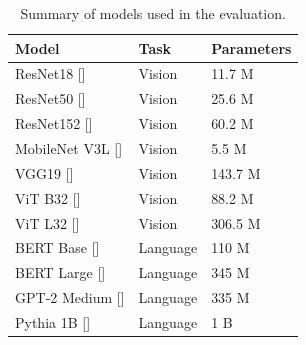 \begin{table}[t]
\centering

\begin{tabular}{l s s @{}}\\
\toprule
Model  & Task & Parameters \\
\midrule
ResNet18 [] & Vision & 11.7 M \\
ResNet50 [] & Vision & 25.6 M \\
ResNet152 [] & Vision & 60.2 M \\
MobileNet V3L []  & Vision & 5.5 M \\
VGG19 [] & Vision & 143.7 M \\
ViT B32 [] & Vision & 88.2 M \\
ViT L32 [] & Vision & 306.5 M \\
BERT Base [] & Language & 110 M \\
BERT Large []  & Language & 345 M \\
GPT-2 Medium [] & Language & 335 M \\
Pythia 1B [] & Language & 1 B \\
\bottomrule
\end{tabular}
\vspace{0.5em}
\caption{\small Summary of models used in the evaluation.}
\label{tab:models}
\end{table}
